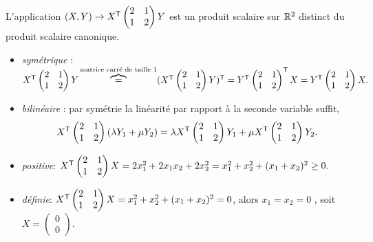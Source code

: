 \documentclass{book}
\begin{document}
\begin{Exemple}
L'application $(X,Y)\to X^{\mathsf {T}}\begin{pmatrix}
2&1 \\1&2
\end{pmatrix}Y$  est un produit scalaire sur $\mathbb{R}^2$ distinct du produit scalaire canonique.
\begin{itemize}
\item \emph{symétrique} : $X^{\mathsf {T}}\begin{pmatrix}
2&1 \\1&2
\end{pmatrix}Y  \overbrace{=}^{\text{matrice carré de taille 1}} (X^{\mathsf {T}}\begin{pmatrix}
2&1 \\1&2
\end{pmatrix}Y)^{\mathsf {T}} =Y^{\mathsf {T}}\begin{pmatrix}
2&1 \\1&2
\end{pmatrix}^{\mathsf {T}}X = Y^{\mathsf {T}}\begin{pmatrix}
2&1 \\1&2
\end{pmatrix}X .$
\item \emph{bilinéaire} : par symétrie la linéarité par rapport à la seconde variable suffit,   $$X^{\mathsf {T}}\begin{pmatrix}
2&1 \\1&2
\end{pmatrix}(\lambda Y_1+\mu Y_2)  =\lambda X^{\mathsf {T}}\begin{pmatrix}
2&1 \\1&2
\end{pmatrix} Y_1+\mu X^{\mathsf {T}}\begin{pmatrix}
2&1 \\1&2
\end{pmatrix} Y_2.$$
\item \emph{positive}: $X^{\mathsf {T}}\begin{pmatrix}
2&1 \\1&2
\end{pmatrix}X=2x_1^2+2x_1x_2+2x_2^2=x_1^2+x_2^2 +(x_1+x_2)^2\geq 0 .$
\item \emph{définie}: $X^{\mathsf {T}}\begin{pmatrix}
2&1 \\1&2
\end{pmatrix}X= x_1^2+x_2^2 +(x_1+x_2)^2 = 0$, alors  $x_1=x_2=0$ , soit $X=\begin{pmatrix}
0 \\0
\end{pmatrix}$.
\end{itemize}
\end{Exemple}
\end{document}

